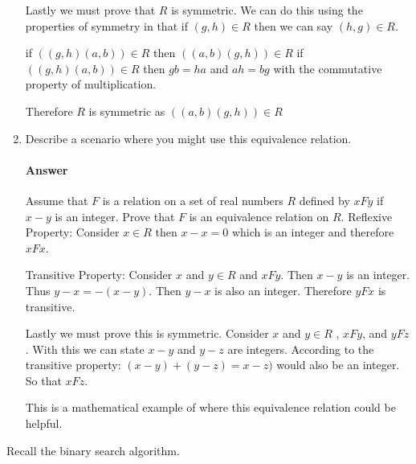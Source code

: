 \documentclass{article}
\begin{document}
\begin{enumerate}
        Lastly we must prove that $R$ is symmetric. We can do this using the properties of symmetry in that 
        if $(g,h) \in R$ then we can say $(h,g) \in R$.
        
        if $((g,h)(a,b)) \in R$ then $((a,b)(g,h)) \in R$
        if $((g,h)(a,b)) \in R$ then $gb=ha$ and $ah=bg$ with the commutative property of multiplication.
        
        Therefore $R$ is symmetric as $((a,b)(g,h)) \in R$


    \item Describe a scenario where you might use this equivalence relation.

        \paragraph{Answer}

        Assume that $F$ is a relation on a set of real numbers $R$ defined by $xFy$ if $x-y$ is an integer. Prove that $F$ is an equivalence relation on $R$.
        Reflexive Property:
        Consider $x \in R$ then $x-x=0$ which is an integer and therefore $xFx$.

        Transitive Property:
        Consider $x$ and $y \in R$ and $xFy$. Then $x-y$ is an integer. Thus $y-x=-(x-y)$. Then $y-x$ is also an integer. Therefore $yFx$ is transitive.

        Lastly we must prove this is symmetric. Consider $x$ and $y \in R$ , $xFy$, and $yFz$. With this we can state $x-y$ and $y-z$ are integers. 
        According to the transitive property: $(x-y) + (y-z) = x-z)$ would also be an integer. So that $xFz$. 
        
        This is a mathematical example of where this equivalence relation could be helpful. 
        

\end{enumerate}

 

Recall the binary search algorithm.
\end{document}
